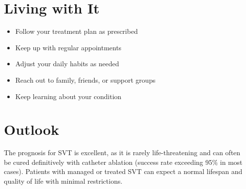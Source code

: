 \section{Living with It}

\begin{itemize}[noitemsep]
  \item Follow your treatment plan as prescribed
  \item Keep up with regular appointments
  \item Adjust your daily habits as needed
  \item Reach out to family, friends, or support groups
  \item Keep learning about your condition
\end{itemize}

\section{Outlook}
The prognosis for SVT is excellent, as it is rarely life-threatening and can often be cured definitively with catheter ablation (success rate exceeding 95\% in most cases). Patients with managed or treated SVT can expect a normal lifespan and quality of life with minimal restrictions.
